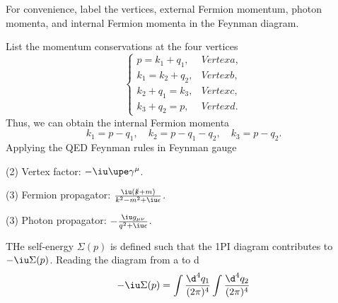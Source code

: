 \begin{solution}
  For convenience, label the vertices, external Fermion momentum, photon
  momenta, and internal Fermion momenta in the Feynman diagram.
  \begin{center}
  \end{center}
  List the momentum conservations at the four vertices
  \[
    \begin{cases*}
      p = k_1 + q_1,    & Vertex a,\\
      k_1 = k_2 + q_2,  & Vertex b,\\
      k_2 + q_1 = k_3,  & Vertex c,\\
      k_3 + q_2 = p,    & Vertex d.
    \end{cases*}
  \]
  Thus, we can obtain the internal Fermion momenta
  \[
    k_1 = p - q_1, \quad k_2 = p - q_1 - q_2, \quad k_3 = p - q_2.
  \]
  Applying the QED Feynman rules in Feynman gauge
  \begin{enumext*}[columns = 8]
    \item(2) Vertex factor: $-\iu\upe\gamma^\mu$.
    \item(3) Fermion propagator:
    $\frac{\iu(\slashed k + m)}{k^2 - m^2 + \iu\epsilon}$.
    \item(3) Photon propagator: $-\frac{\iu g_{\mu\nu}}{q^2 + \iu\epsilon}$.
  \end{enumext*}
  THe self-energy $\Sigma(p)$ is defined such that the 1PI diagram contributes
  to $-\iu\Sigma(p)$. Reading the diagram from a to d
  \begin{multline*}
    -\iu\Sigma(p) = \int \frac{\d^4q_1}{(2\pi)^4} \int \frac{\d^4q_2}{(2\pi)^4}

\end{multline*}
\end{solution}

